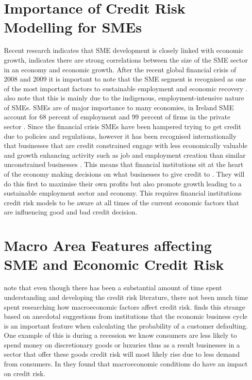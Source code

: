 \section{Importance of Credit Risk Modelling for SMEs}
Recent research indicates that SME development is closely linked with economic growth, \cite{beck_smes_2005} indicates there are strong correlations between the size of the SME sector in an economy and economic growth. After the recent global financial crisis of 2008 and 2009 it is important to note that the SME segment is recognised as one of the most important factors to sustainable employment and economic recovery \citep{lawless_smes_2012}. \cite{lawless_smes_2012} also note that this is mainly due to the indigenous, employment-intensive nature of SMEs. SMEs are of major importance to many economies, in Ireland SME account for 68 percent of employment and 99 percent of firms in the private sector \citep{lawless_irish_2012}. Since the financial crisis SMEs have been hampered trying to get credit due to policies and regulations, however it has been recognised internationally that businesses that are credit constrained engage with less economically valuable and growth enhancing activity such as job and employment creation than similar unconstrained businesses \citep{campello_real_2010}. This means that financial institutions sit at the heart of the economy making decisions on what businesses to give credit to . They will do this first to maximise their own profits but also promote growth leading to a sustainable employment sector and economy. This requires financial institutions credit risk models to be aware at all times of the current economic factors that are influencing good and bad credit decision. 

\section{Macro Area Features affecting SME and Economic Credit Risk}
\cite{hackbarth_capital_2006} note that even though there has been a substantial amount of time spent understanding and developing the credit risk literature, there not been much time spent researching how macroeconomic factors affect credit risk.  \cite{hackbarth_capital_2006} finds this strange based on anecdotal suggestions from institutions that the economic business cycle is an important feature when calculating the probability of a customer defaulting. One example of this is during a recession we know consumers are less likely to spend money on discretionary goods or luxuries thus as a result businesses in a sector that offer these goods credit risk will most likely rise due to less demand from consumers. In \cite{hackbarth_capital_2006} they found that macroeconomic conditions do have an impact on credit risk.

